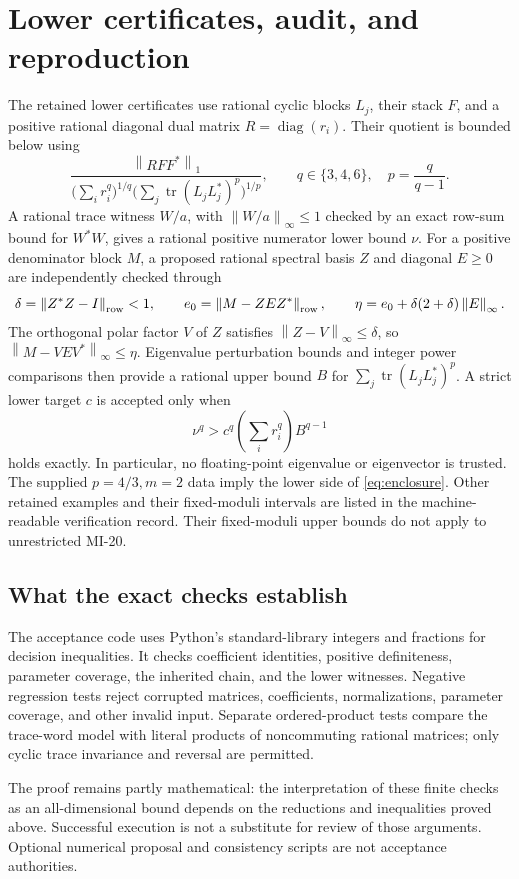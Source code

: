 \documentclass[11pt]{article}
\newcommand{\tr}{\operatorname{tr}}
\newcommand{\diag}{\operatorname{diag}}
\newcommand{\norm}[1]{\left\lVert#1\right\rVert}
\theoremstyle{remark}\newtheorem{remark}[theorem]{Remark}
\begin{document}
\section{Lower certificates, audit, and reproduction}
The retained lower certificates use rational cyclic blocks \(L_j\), their stack \(F\), and a positive rational diagonal dual matrix \(R=\diag(r_i)\). Their quotient is bounded below using
\[
 \frac{\norm{RFF^*}_1}
 {\bigl(\sum_i r_i^q\bigr)^{1/q}
  \bigl(\sum_j\tr(L_jL_j^*)^p\bigr)^{1/p}},
 \qquad q\in\{3,4,6\},\quad p=\frac q{q-1}.
\]
A rational trace witness \(W/a\), with \(\norm{W/a}_\infty\le1\) checked by an exact row-sum bound for \(W^*W\), gives a rational positive numerator lower bound \(\nu\). For a positive denominator block \(M\), a proposed rational spectral basis \(Z\) and diagonal \(E\ge0\) are independently checked through
\[
 \delta=\norm{Z^*Z-I}_{\rm row}<1,\qquad
 e_0=\norm{M-ZEZ^*}_{\rm row},\qquad
 \eta=e_0+\delta(2+\delta)\norm E_\infty.
\]
The orthogonal polar factor \(V\) of \(Z\) satisfies \(\norm{Z-V}_\infty\le\delta\), so \(\norm{M-VEV^*}_\infty\le\eta\). Eigenvalue perturbation bounds and integer power comparisons then provide a rational upper bound \(B\) for \(\sum_j\tr(L_jL_j^*)^p\). A strict lower target \(c\) is accepted only when
\[
 \nu^q>c^q\left(\sum_i r_i^q\right)B^{q-1}
\]
holds exactly. In particular, no floating-point eigenvalue or eigenvector is trusted. The supplied \(p=4/3,m=2\) data imply the lower side of \eqref{eq:enclosure}. Other retained examples and their fixed-moduli intervals are listed in the machine-readable verification record. Their fixed-moduli upper bounds do not apply to unrestricted MI-20.

\subsection{What the exact checks establish}
The acceptance code uses Python's standard-library integers and fractions for decision inequalities. It checks coefficient identities, positive definiteness, parameter coverage, the inherited chain, and the lower witnesses. Negative regression tests reject corrupted matrices, coefficients, normalizations, parameter coverage, and other invalid input. Separate ordered-product tests compare the trace-word model with literal products of noncommuting rational matrices; only cyclic trace invariance and reversal are permitted.

The proof remains partly mathematical: the interpretation of these finite checks as an all-dimensional bound depends on the reductions and inequalities proved above. Successful execution is not a substitute for review of those arguments. Optional numerical proposal and consistency scripts are not acceptance authorities.
\end{document}
